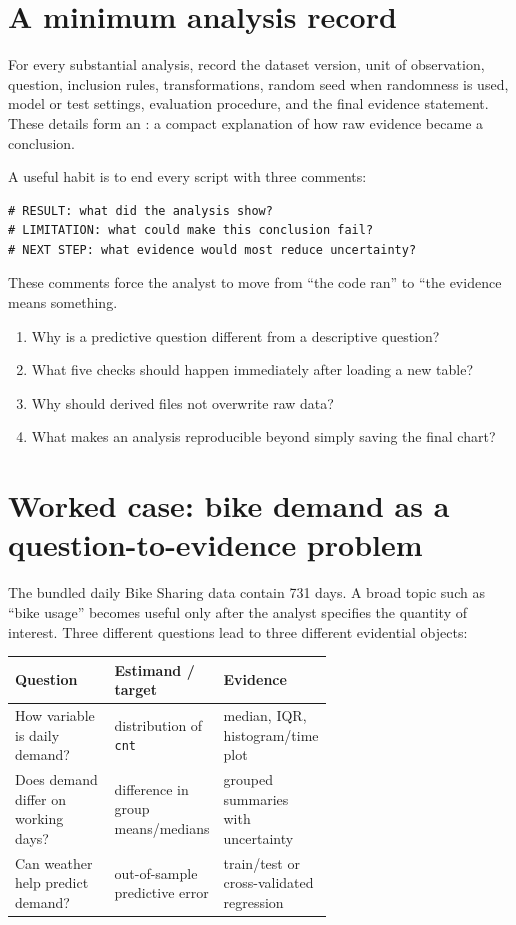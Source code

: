 \section{A minimum analysis record}
For every substantial analysis, record the dataset version, unit of observation, question, inclusion rules, transformations, random seed when randomness is used, model or test settings, evaluation procedure, and the final evidence statement. These details form an : a compact explanation of how raw evidence became a conclusion.

A useful habit is to end every script with three comments:
\begin{lstlisting}[style=dsr]
# RESULT: what did the analysis show?
# LIMITATION: what could make this conclusion fail?
# NEXT STEP: what evidence would most reduce uncertainty?
\end{lstlisting}
These comments force the analyst to move from ``the code ran'' to ``the evidence means something.

\begin{quickcheck}
\begin{enumerate}
  \item Why is a predictive question different from a descriptive question?
  \item What five checks should happen immediately after loading a new table?
  \item Why should derived files not overwrite raw data?
  \item What makes an analysis reproducible beyond simply saving the final chart?
\end{enumerate}
\end{quickcheck}

\section{Worked case: bike demand as a question-to-evidence problem}

The bundled daily Bike Sharing data contain 731 days. A broad topic such as ``bike usage'' becomes useful only after the analyst specifies the quantity of interest. Three different questions lead to three different evidential objects:

\begin{dstable}
\begin{tabularx}{\linewidth}{@{}
  D{0.35\linewidth}
  D{0.28\linewidth}
  Y@{}}
\toprule
{}
\textbf{Question} & \textbf{Estimand / target} & \textbf{Evidence} \\
\midrule
How variable is daily demand? & distribution of \texttt{cnt} & median, IQR, histogram/time plot \\
Does demand differ on working days? & difference in group means/medians & grouped summaries with uncertainty \\
Can weather help predict demand? & out-of-sample predictive error & train/test or cross-validated regression \\
\bottomrule
\end{tabularx}
\end{dstable}

